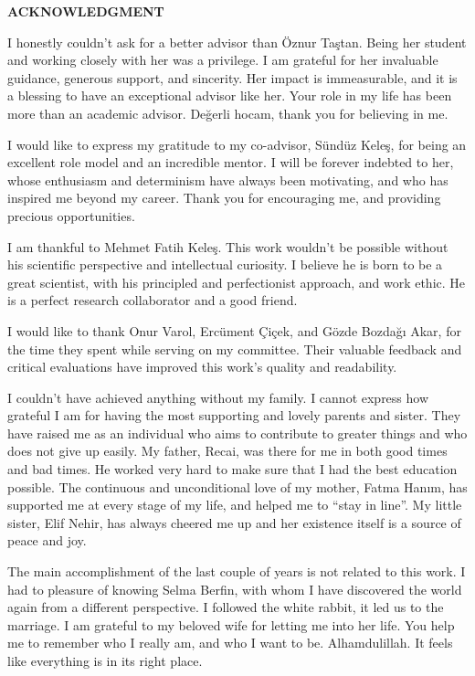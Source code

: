 \clearpage
\setlength{\parindent}{0pt}
\begin{center}
	\MakeUppercase{\textbf{acknowledgment}} \\ [3\baselineskip]
\end{center}

I honestly couldn't ask for a better advisor than Öznur Taştan.
Being her student and working closely with her was a privilege.
I am grateful for her invaluable guidance, generous support, and sincerity.
Her impact is immeasurable, and it is a blessing to have an exceptional advisor like her.
Your role in my life has been more than an academic advisor.
Değerli hocam, thank you for believing in me.

I would like to express my gratitude to my co-advisor, Sündüz Keleş, for being an excellent role model and an incredible mentor.
I will be forever indebted to her, whose enthusiasm and determinism have always been motivating, and who has inspired me beyond my career.
Thank you for encouraging me, and providing precious opportunities.

I am thankful to Mehmet Fatih Keleş.
This work wouldn't be possible without his scientific perspective and intellectual curiosity.
I believe he is born to be a great scientist, with his principled and perfectionist approach, and work ethic.
He is a perfect research collaborator and a good friend.

I would like to thank Onur Varol, Ercüment Çiçek, and Gözde Bozdağı Akar, for the time they spent while serving on my committee.
Their valuable feedback and critical evaluations have improved this work's quality and readability.


I couldn't have achieved anything without my family.
I cannot express how grateful I am for having the most supporting and lovely parents and sister.
They have raised me as an individual who aims to contribute to greater things and who does not give up easily.
My father, Recai, was there for me in both good times and bad times.
He worked very hard to make sure that I had the best education possible.
The continuous and unconditional love of my mother, Fatma Hanım, has supported me at every stage of my life, and helped me to ``stay in line''.
My little sister, Elif Nehir, has always cheered me up and her existence itself is a source of peace and joy.

The main accomplishment of the last couple of years is not related to this work.
I had to pleasure of knowing Selma Berfin, with whom I have discovered the world again from a different perspective.
I followed the white rabbit, it led us to the marriage.
I am grateful to my beloved wife for letting me into her life.
You help me to remember who I really am, and who I want to be.
Alhamdulillah.
It feels like everything is in its right place.
